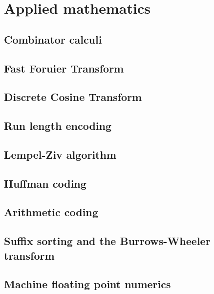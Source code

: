 
\chapter{Applied mathematics}

\section{Combinator calculi}

\section{Fast Foruier Transform}

\section{Discrete Cosine Transform}

\section{Run length encoding}

\section{Lempel-Ziv algorithm}

\section{Huffman coding}

\section{Arithmetic coding}

\section{Suffix sorting and the Burrows-Wheeler transform}

\section{Machine floating point numerics}
